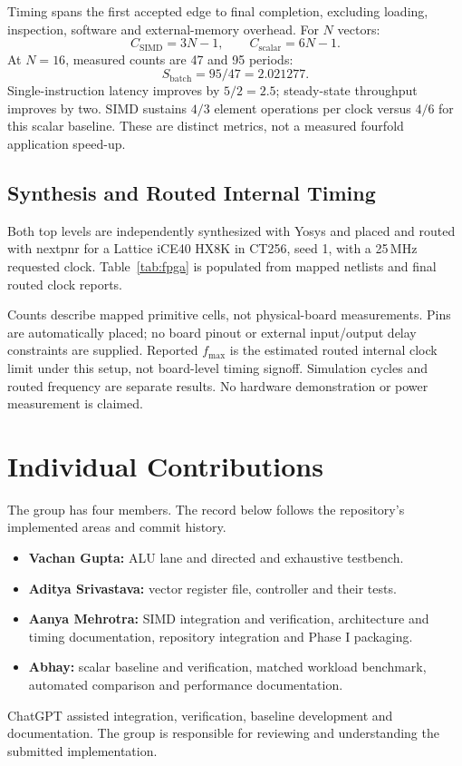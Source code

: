 \documentclass[conference]{IEEEtran}
\begin{document}
Timing spans the first accepted edge to final completion, excluding loading, inspection, software and external-memory overhead. For $N$ vectors:
\begin{equation}
C_{\mathrm{SIMD}}=3N-1,\qquad C_{\mathrm{scalar}}=6N-1.
\end{equation}
At $N=16$, measured counts are 47 and 95 periods:
\begin{equation}
S_{\mathrm{batch}}=95/47=2.021277.
\end{equation}
Single-instruction latency improves by $5/2=2.5$; steady-state throughput improves by two. SIMD sustains $4/3$ element operations per clock versus $4/6$ for this scalar baseline. These are distinct metrics, not a measured fourfold application speed-up.

\subsection{Synthesis and Routed Internal Timing}
Both top levels are independently synthesized with Yosys and placed and routed with nextpnr for a Lattice iCE40 HX8K in CT256, seed 1, with a 25\,MHz requested clock. Table~\ref{tab:fpga} is populated from mapped netlists and final routed clock reports.
\begin{table}[t]
\caption{Measured target-specific implementation results}
\label{tab:fpga}
\centering\scriptsize

\end{table}
Counts describe mapped primitive cells, not physical-board measurements. Pins are automatically placed; no board pinout or external input/output delay constraints are supplied. Reported $f_{\max}$ is the estimated routed internal clock limit under this setup, not board-level timing signoff. Simulation cycles and routed frequency are separate results. No hardware demonstration or power measurement is claimed.

\section{Individual Contributions}
The group has four members. The record below follows the repository's implemented areas and commit history.
\begin{itemize}
\item \textbf{Vachan Gupta:} ALU lane and directed and exhaustive testbench.
\item \textbf{Aditya Srivastava:} vector register file, controller and their tests.
\item \textbf{Aanya Mehrotra:} SIMD integration and verification, architecture and timing documentation, repository integration and Phase I packaging.
\item \textbf{Abhay:} scalar baseline and verification, matched workload benchmark, automated comparison and performance documentation.
\end{itemize}
ChatGPT assisted integration, verification, baseline development and documentation. The group is responsible for reviewing and understanding the submitted implementation.
\end{document}
